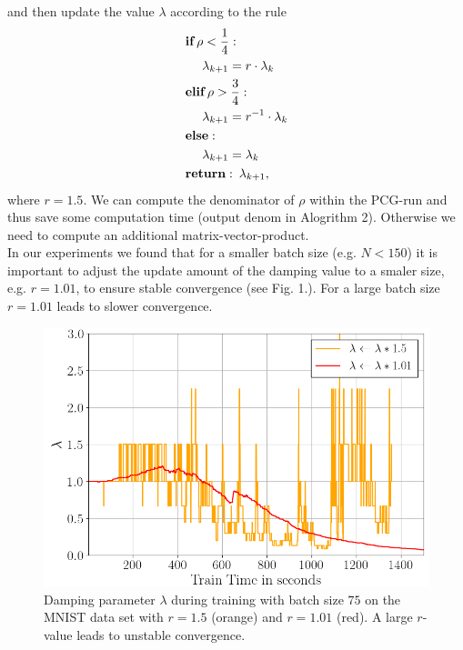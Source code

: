 \documentclass[conference]{IEEEtran}
\begin{document}
	and then update the value $\lambda$ according to the rule
	\begin{align}
	&\textbf{if}\:\rho<\frac{1}{4}:\notag\\
	&\text{ }\text{ }\text{ }\text{ }\lambda_{k+1} = r\cdot\lambda_{k}\notag\\
	&\textbf{elif}\:\rho>\frac{3}{4}:\notag\\
	&\text{ }\text{ }\text{ }\text{ }\lambda_{k + 1} = r^{-1}\cdot\lambda_{k}\notag\\
	&\textbf{else}: \notag\\
	&\text{ }\text{ }\text{ }\text{ }\lambda_{k + 1} = \lambda_{k}\notag\\
	&\textbf{return}:\:\lambda_{k + 1},
	\end{align}
	where $r=1.5$. We can compute the denominator of $\rho$ within the PCG-run and thus save some computation time (output denom in Alogrithm 2). Otherwise we need to compute an additional matrix-vector-product.\\
	In our experiments we found that for a smaller batch size (e.g. $N<150$) it is important to adjust the update amount of the damping value to a smaler size, e.g. $r=1.01$, to ensure stable convergence (see Fig. 1.). For a large batch size $r=1.01$ leads to slower convergence.

	\begin{figure}[htbp]
		\centerline{\includegraphics[scale=0.52]{lambda.png}}
		\caption{Damping parameter $\lambda$ during training with batch size $75$ on the MNIST data set with $r=1.5$ (orange) and $r=1.01$ (red). A large $r$-value leads to unstable convergence.}
		\label{fig1}
	\end{figure}
\end{document}
